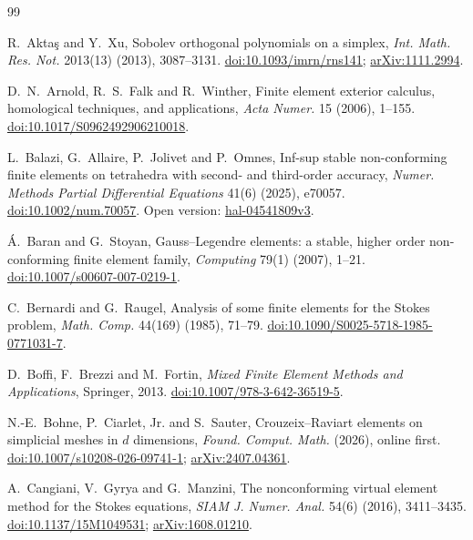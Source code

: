 \documentclass[11pt,a4paper]{article}
\theoremstyle{definition}
\theoremstyle{remark}
\begin{document}
\begin{thebibliography}{99}\small

 R.~Aktaş and Y.~Xu, Sobolev orthogonal polynomials on a simplex,
\emph{Int. Math. Res. Not.} 2013(13) (2013), 3087--3131.
\href{https://doi.org/10.1093/imrn/rns141}{doi:10.1093/imrn/rns141};
\href{https://arxiv.org/abs/1111.2994}{arXiv:1111.2994}.

 D.~N.~Arnold, R.~S.~Falk and R.~Winther, Finite element exterior
calculus, homological techniques, and applications, \emph{Acta Numer.} 15 (2006),
1--155. \href{https://doi.org/10.1017/S0962492906210018}{doi:10.1017/S0962492906210018}.

 L.~Balazi, G.~Allaire, P.~Jolivet and P.~Omnes, Inf-sup stable
non-conforming finite elements on tetrahedra with second- and third-order accuracy,
\emph{Numer. Methods Partial Differential Equations} 41(6) (2025), e70057.
\href{https://doi.org/10.1002/num.70057}{doi:10.1002/num.70057}. Open version:
\href{https://hal.science/hal-04541809v3}{hal-04541809v3}.

 Á.~Baran and G.~Stoyan, Gauss--Legendre elements: a stable, higher
order non-conforming finite element family, \emph{Computing} 79(1) (2007), 1--21.
\href{https://doi.org/10.1007/s00607-007-0219-1}{doi:10.1007/s00607-007-0219-1}.

 C.~Bernardi and G.~Raugel, Analysis of some finite elements for the
Stokes problem, \emph{Math. Comp.} 44(169) (1985), 71--79.
\href{https://doi.org/10.1090/S0025-5718-1985-0771031-7}{doi:10.1090/S0025-5718-1985-0771031-7}.

 D.~Boffi, F.~Brezzi and M.~Fortin, \emph{Mixed Finite Element
Methods and Applications}, Springer, 2013.
\href{https://doi.org/10.1007/978-3-642-36519-5}{doi:10.1007/978-3-642-36519-5}.

 N.-E.~Bohne, P.~Ciarlet, Jr. and S.~Sauter, Crouzeix--Raviart
elements on simplicial meshes in \(d\) dimensions, \emph{Found. Comput. Math.}
(2026), online first.
\href{https://doi.org/10.1007/s10208-026-09741-1}{doi:10.1007/s10208-026-09741-1};
\href{https://arxiv.org/abs/2407.04361}{arXiv:2407.04361}.

 A.~Cangiani, V.~Gyrya and G.~Manzini, The nonconforming virtual
element method for the Stokes equations, \emph{SIAM J. Numer. Anal.} 54(6) (2016),
3411--3435. \href{https://doi.org/10.1137/15M1049531}{doi:10.1137/15M1049531};
\href{https://arxiv.org/abs/1608.01210}{arXiv:1608.01210}.


\end{thebibliography}
\end{document}
